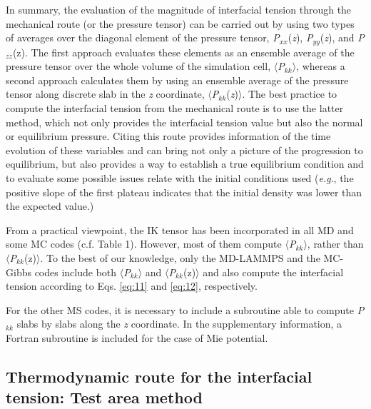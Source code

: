 \documentclass[9pt,bestpractices]{livecoms}
\begin{document}
In summary, the evaluation of the magnitude of interfacial tension through the
mechanical route (or the pressure tensor) can be carried out by using two types
of averages over the diagonal element of the pressure tensor,
\textit{P}$_{xx}$(\textit{z}), \textit{P}$_{yy}$(\textit{z}), and
\textit{P}$_{zz}$(z). The first approach evaluates these elements as an
ensemble average of the pressure tensor over the whole volume of the simulation
cell, ${\langle}$\textit{P}$_{kk}$${\rangle}$, whereas a second approach
calculates them by using an ensemble average of the pressure tensor along
discrete slab in the \textit{z} coordinate,
${\langle}$\textit{P}$_{kk}$(\textit{z})${\rangle}$. The best practice to
compute the interfacial tension from the mechanical route is to use the latter 
method, which not only provides the interfacial tension value but also the
normal or equilibrium pressure. Citing \citet{holcomb1993} this route provides information of the time
evolution of these variables and can bring not only a picture of the
progression to equilibrium,  but also provides a way to establish a true
equilibrium condition and to evaluate some possible issues relate with the
initial conditions used (\textit{e.g}., the positive slope of the first plateau
indicates that the initial density was lower than the expected value.) 

From a practical viewpoint, the IK tensor has been incorporated in all MD and
some MC codes (c.f. Table 1). However, most of them compute
${\langle}$\textit{P}$_{kk}$${\rangle}$, rather than
${\langle}$\textit{P}$_{kk}$(z)${\rangle}$. To the best of our knowledge, only
the MD-LAMMPS and the MC-Gibbs codes include both
${\langle}$\textit{P}$_{kk}$${\rangle}$ and
${\langle}$\textit{P}$_{kk}$(z)${\rangle}$ and also compute the interfacial
tension according to Eqs. \ref{eq:11} and \ref{eq:12}, respectively.

For the other MS codes, it is necessary to include a subroutine able to compute
\textit{P}$_{kk}$ slabs by slabs along the \textit{z} coordinate. In the
supplementary information, a Fortran subroutine is included for the case of Mie
potential. 

\subsection{Thermodynamic route for the interfacial tension: Test area method}
\end{document}
